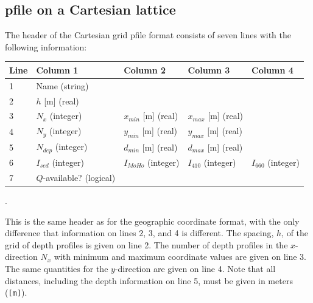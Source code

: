 \documentclass[11pt]{report}
\begin{document}
\subsection{pfile on a Cartesian lattice}
The header of the Cartesian grid pfile format consists of seven lines with the following information:
\begin{center}
\begin{tabular}{lllll}\hline
Line & Column 1& Column 2& Column 3& Column 4\\ \hline
1 & Name (string) & & & \\ \hline
2 & $h$ [m] (real) & & & \\ \hline
3 & $N_{x}$ (integer) & $x_{min}$ [m] (real) & $x_{max}$ [m] (real) & \\ \hline
4 & $N_{y}$ (integer) & $y_{min}$ [m] (real) & $y_{max}$ [m] (real) & \\ \hline
5 & $N_{dep}$ (integer) & $d_{min}$ [m] (real) & $d_{max}$ [m] (real) & \\ \hline
6 & $I_{sed}$ (integer) & $I_{MoHo}$ (integer) & $I_{410}$ (integer) & $I_{660}$ (integer) \\ \hline
7 & $Q$-available? (logical) \\ \hline
\end{tabular}.
\end{center}
This is the same header as for the geographic coordinate format, with the only difference that information on
lines 2, 3, and 4 is different. The spacing, $h$, of the grid of depth profiles is given on line 2.
The number of depth profiles in the $x$-direction $N_x$ with minimum and maximum coordinate values
are given on line 3. The same quantities for the $y$-direction are given on line 4. Note that all 
distances, including the depth information on line 5, must be given in meters ({\tt [m]}).
\end{document}
